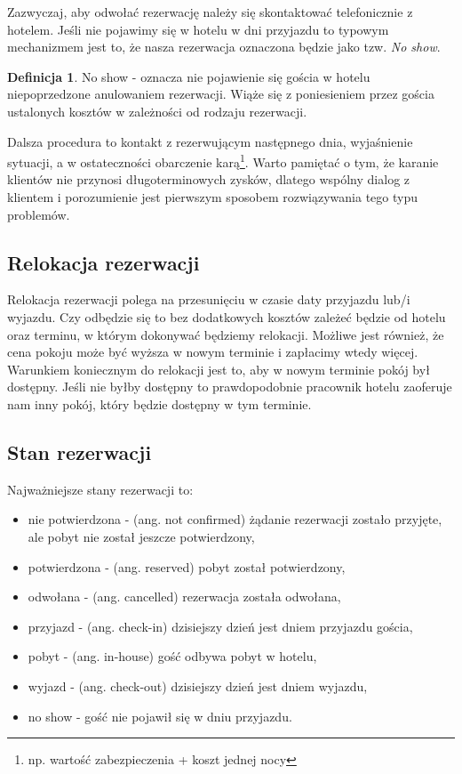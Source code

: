 \documentclass[a4paper,onecolumn,oneside,11pt,wide,floatssmall]{mwrep}
\theoremstyle{definition}
\newtheorem{defn}{Definicja}[section]
\theoremstyle{plain}%
\theoremstyle{remark}
\begin{document}
Zazwyczaj, aby odwołać rezerwację należy się skontaktować telefonicznie z 
hotelem. Jeśli nie pojawimy się w hotelu w dni przyjazdu to typowym mechanizmem jest 
to, że nasza rezerwacja oznaczona będzie jako tzw. \emph{No show}. 

\begin{defn}{No show}
- oznacza nie pojawienie się gościa w hotelu niepoprzedzone anulowaniem rezerwacji. 
Wiąże się z poniesieniem przez gościa ustalonych kosztów w zależności od 
rodzaju rezerwacji.
\end{defn}

Dalsza procedura to kontakt z rezerwującym następnego dnia, wyjaśnienie 
sytuacji, a w ostateczności obarczenie karą\footnote{np. wartość zabezpieczenia 
+ koszt jednej nocy}. Warto pamiętać o tym, że karanie klientów nie przynosi 
długoterminowych zysków, dlatego wspólny dialog z klientem i porozumienie 
jest pierwszym sposobem rozwiązywania tego typu problemów.

\subsection{Relokacja rezerwacji}
Relokacja rezerwacji polega na przesunięciu w czasie daty przyjazdu lub/i 
wyjazdu. Czy odbędzie się to bez dodatkowych kosztów zależeć będzie od 
hotelu oraz terminu, w którym dokonywać będziemy relokacji. Możliwe jest 
również, że cena pokoju może być wyższa w nowym terminie i zapłacimy wtedy 
więcej. Warunkiem koniecznym do relokacji jest to, aby w nowym terminie 
pokój był dostępny. Jeśli nie byłby dostępny to prawdopodobnie pracownik 
hotelu zaoferuje nam inny pokój, który będzie dostępny w 
tym terminie.

\subsection{Stan rezerwacji}
\label{chap1:stany-rezerwacji}
Najważniejsze stany rezerwacji to:
\begin{itemize}
  \item nie potwierdzona - (ang. not confirmed) żądanie rezerwacji zostało 
  przyjęte, ale pobyt nie został jeszcze potwierdzony,
  \item potwierdzona - (ang. reserved) pobyt został potwierdzony,
  \item odwołana - (ang. cancelled) rezerwacja została odwołana,
  \item przyjazd - (ang. check-in) dzisiejszy dzień jest dniem przyjazdu 
  gościa,
  \item pobyt - (ang. in-house) gość odbywa pobyt w hotelu,
  \item wyjazd - (ang. check-out) dzisiejszy dzień jest dniem wyjazdu,
  \item no show - gość nie pojawił się w dniu przyjazdu.
\end{itemize}
\end{document}
